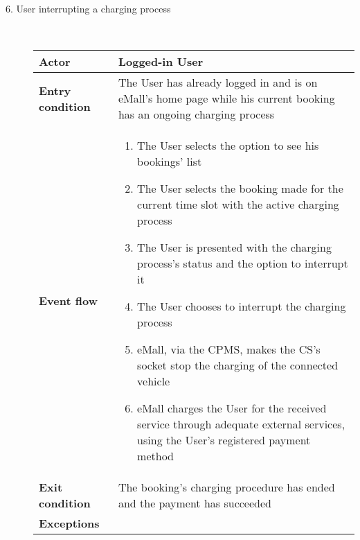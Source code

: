 \documentclass[11pt]{article}
\begin{document}
\begin{description}
    \item [6. User interrupting a charging process] \hfill \\
    \begin{table}[H]
        \centering
        \setlength{\tabcolsep}{18pt}
        \renewcommand{\arraystretch}{1.4}
        \begin{tabularx}{\textwidth}{|>{\hsize=0.5\hsize}X|>{\hsize=1.5\hsize}X|}
            \hline
            \textbf{Actor} & Logged-in User \\
            \hline
            \textbf{Entry condition} & The User has already logged in and is on eMall's home page while his current booking has an ongoing charging process \\
            \hline
            \textbf{Event flow} & 
                \begin{minipage}[t]{\hsize}
                \begin{enumerate}[topsep=0pt, leftmargin=*]
                    \item The User selects the option to see his bookings' list
                    \item The User selects the booking made for the current time slot with the active charging process
                    \item The User is presented with the charging process's status and the option to interrupt it
                    \item The User chooses to interrupt the charging process
                    \item eMall, via the CPMS, makes the CS's socket stop the charging of the connected vehicle
                    \item eMall charges the User for the received service through adequate external services, using the User’s registered payment method
                \end{enumerate}
                \end{minipage}
                \vspace{6pt}
            \\
            \hline
            \textbf{Exit condition} & The booking's charging procedure has ended and the payment has succeeded \\
            \hline
            \textbf{Exceptions} & 
                \begin{minipage}[t]{\hsize}

\end{minipage}
\end{tabularx}
\end{table}
\end{description}
\end{document}

